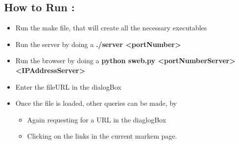 \documentclass[10pt]{article}
\begin{document}
\subsection{\color{Violet}How to Run : }
\begin{itemize}
 \item  Run the make file, that will create all the necessary executables
\item Run the server by doing a \textbf{./server <portNumber> }
\item Run the browser by doing a \textbf{python sweb.py <portNumberServer> <IPAddressServer>}
\item Enter the fileURL in the dialogBox
\item Once the file is loaded, other queries can be made, by 
\begin{itemize}
 \item Again requesting for a URL in the diaglogBox
  \item Clicking on the links in the current markem page.
\end{itemize}

\end{itemize}
\end{document}
